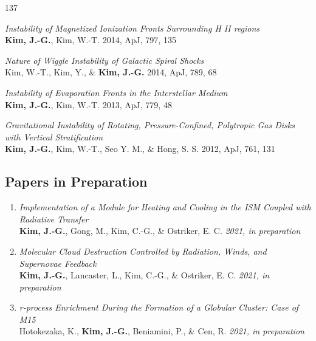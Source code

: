 \begin{benumerate}{13}
137
\item \textit{Instability of Magnetized Ionization Fronts Surrounding H II
regions}\\ \textbf{Kim, J.-G.}, Kim, W.-T. 2014, ApJ, 797, 135
\item \textit{Nature of Wiggle Instability of Galactic Spiral Shocks}\\ Kim,
W.-T., Kim, Y., \& \textbf{Kim, J.-G.} 2014, ApJ, 789, 68
\item \textit{Instability of Evaporation Fronts in the Interstellar Medium}\\
  \textbf{Kim, J.-G.}, Kim, W.-T. 2013, ApJ, 779, 48
\item \textit{Gravitational Instability of Rotating, Pressure-Confined,
    Polytropic Gas Disks with Vertical Stratification} \\ \textbf{Kim, J.-G.},
  Kim, W.-T., Seo Y. M., \& Hong, S. S. 2012, ApJ, 761, 131
\end{benumerate}

\subsection{Papers in Preparation}
\begin{enumerate}
\item[] \textit{Implementation of a Module for Heating and Cooling in the ISM
    Coupled with Radiative Transfer}\\ \textbf{Kim, J.-G.}, Gong, M., Kim,
  C.-G., \& Ostriker, E. C. \textit{2021, in preparation}
\item[] \textit{Molecular Cloud Destruction Controlled by Radiation, Winds, and
Supernovae Feedback} \\ \textbf{Kim, J.-G.}, Lancaster, L., Kim, C.-G., \&
Ostriker, E. C. \textit{2021, in preparation}
\item[] \textit{r-process Enrichment During the Formation of a Globular Cluster: Case
    of M15} \\
  Hotokezaka, K., \textbf{Kim, J.-G.}, Beniamini, P., \& Cen, R. \textit{2021,
    in preparation}

\end{enumerate}

